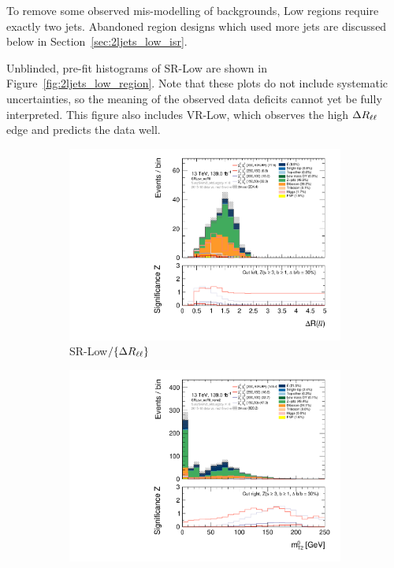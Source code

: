 To remove some observed mis-modelling of backgrounds, Low regions require
exactly two jets.
Abandoned region designs which used more jets are discussed below in
Section~\ref{sec:2ljets_low_isr}.

Unblinded, pre-fit histograms of SR-Low are shown in
Figure~\ref{fig:2ljets_low_region}.
Note that these plots do not include systematic uncertainties, so the meaning
of the observed data deficits cannot yet be fully interpreted.
This figure also includes VR-Low, which observes the high $\Delta R_{\ell\ell}$ edge and
predicts the data well.

\begin{figure}[tp]
\centering
\begin{subfigure}{0.48\textwidth}
\centering
\includegraphics[width=\textwidth]{figures/2ljets_low_Rll_SRLow_noRll.pdf}
\caption{SR-Low$/\{\Delta R_{\ell\ell}\}$}
\end{subfigure}
\hfill
\begin{subfigure}{0.48\textwidth}
\centering
\includegraphics[width=\textwidth]{figures/2ljets_low_mt2leplsp_0_SRLow_noRll_nomt2.pdf}

\end{subfigure}
\end{figure}

